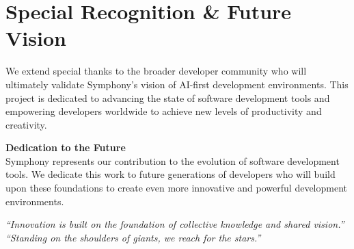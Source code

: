 \section*{Special Recognition \& Future Vision}

We extend special thanks to the broader developer community who will ultimately validate Symphony's vision of AI-first development environments. This project is dedicated to advancing the state of software development tools and empowering developers worldwide to achieve new levels of productivity and creativity.

\begin{center}
\begin{tcolorbox}[
    colback=brandPrimary!10,
    colframe=brandPrimary,
    boxrule=2pt,
    arc=5pt,
    width=0.9\textwidth
]
\textbf{Dedication to the Future}\\[0.5em]
Symphony represents our contribution to the evolution of software development tools. We dedicate this work to future generations of developers who will build upon these foundations to create even more innovative and powerful development environments.
\end{tcolorbox}
\end{center}

\vspace{0.5cm}
\begin{center}
\textit{``Innovation is built on the foundation of collective knowledge and shared vision.''}\\[0.3cm]
\textit{``Standing on the shoulders of giants, we reach for the stars.''}
\end{center}

\clearpage
